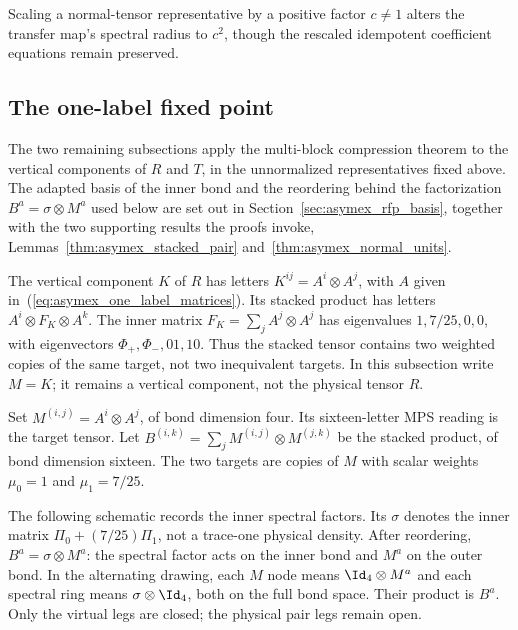 Scaling a normal-tensor representative by a positive factor $c \ne 1$
alters the transfer map's spectral radius to $c^2$, though the rescaled
idempotent coefficient equations remain preserved.

\subsection{The one-label fixed point}%
\label{sec:asymex_one_label}

The two remaining subsections apply the multi-block compression theorem
to the vertical components of $R$ and $T$, in the unnormalized
representatives fixed above. The adapted basis of the inner bond and the
reordering behind the factorization $B^a=\sigma\otimes M^a$ used below
are set out in Section~\ref{sec:asymex_rfp_basis}, together with the two
supporting results the proofs invoke,
Lemmas~\ref{thm:asymex_stacked_pair} and~\ref{thm:asymex_normal_units}.

The vertical component $K$ of $R$ has letters
$K^{ij}=A^i\otimes A^j$, with $A$ given
in~(\ref{eq:asymex_one_label_matrices}). Its stacked product has
letters $A^i\otimes F_K\otimes A^k$. The inner matrix
$F_K=\sum_jA^j\otimes A^j$ has eigenvalues $1,7/25,0,0$,
with eigenvectors $\Phi_+,\Phi_-,01,10$.
Thus the stacked tensor contains two weighted copies of the same
target, not two inequivalent targets. In this subsection write $M=K$;
it remains a vertical component, not the physical tensor $R$.

\begin{definition}
    \label{def:asymex_one_label}
    \leanok
    Set $M^{(i,j)}=A^i\otimes A^j$, of bond dimension four.
    Its sixteen-letter MPS reading is the target tensor.
    Let $B^{(i,k)}=\sum_jM^{(i,j)}\otimes M^{(j,k)}$ be the stacked
    product, of bond dimension sixteen. The two targets are copies
    of $M$ with scalar weights $\mu_0=1$ and $\mu_1=7/25$.
\end{definition}

The following schematic records the inner spectral factors. Its
$\sigma$ denotes the inner matrix $\Pi_0+(7/25)\Pi_1$, not a
trace-one physical density. After reordering,
$B^a=\sigma\otimes M^a$: the spectral factor acts on the inner bond
and $M^a$ on the outer bond. In the alternating drawing, each $M$
node means $\Id_4\otimes M^a$ and each spectral ring means
$\sigma\otimes\Id_4$, both on the full bond space. Their product is
$B^a$. Only the virtual legs are closed; the physical pair legs remain open.

